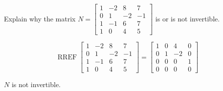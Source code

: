 
\begin{exerciseStatement}


Explain why the matrix \(N= \left[\begin{array}{cccc}
1 & -2 & 8 & 7 \\
0 & 1 & -2 & -1 \\
1 & -1 & 6 & 7 \\
1 & 0 & 4 & 5
\end{array}\right] \) is or is not invertible.


\end{exerciseStatement}
    
\begin{exerciseAnswer} 


\[\operatorname{RREF} \left[\begin{array}{cccc}
1 & -2 & 8 & 7 \\
0 & 1 & -2 & -1 \\
1 & -1 & 6 & 7 \\
1 & 0 & 4 & 5
\end{array}\right] = \left[\begin{array}{cccc}
1 & 0 & 4 & 0 \\
0 & 1 & -2 & 0 \\
0 & 0 & 0 & 1 \\
0 & 0 & 0 & 0
\end{array}\right] \]

\(N\) is not invertible.
\end{exerciseAnswer}
    

